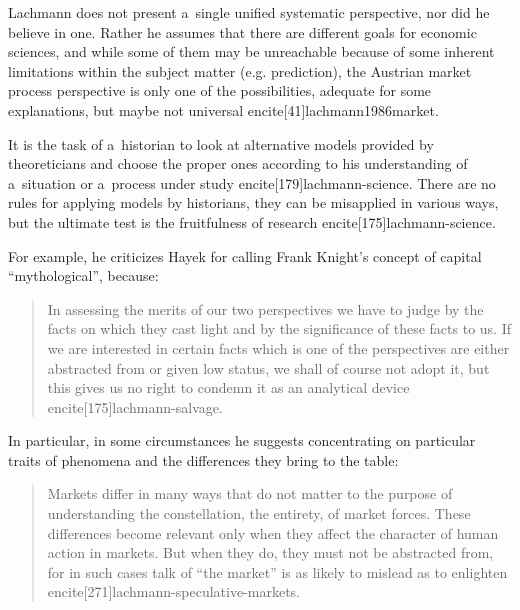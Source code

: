 {Lachmann does not present a~single unified systematic perspective, nor did he believe in one. Rather he assumes that there are different goals for economic sciences, and while some of them may be unreachable because of some inherent limitations within the subject matter (e.g. prediction), the Austrian market process perspective is only one of the possibilities, adequate for some explanations, but maybe not universal encite[41]{lachmann1986market}.



It is the task of a~historian to look at alternative models provided by theoreticians and choose the proper ones according to his understanding of a~situation or a~process under study encite[179]{lachmann-science}. There are no rules for applying models by historians, they can be misapplied in various ways, but the ultimate test is the fruitfulness of research encite[175]{lachmann-science}.

For example, he criticizes Hayek for calling Frank Knight's concept of capital ``mythological'', because:

\begin{quote}

In assessing the merits of our two perspectives we have to judge by the facts on which they cast light and by the significance of these facts to us. If we are interested in certain facts which is one of the perspectives are either abstracted from or given low status, we shall of course not adopt it, but this gives us no right to condemn it as an analytical device encite[175]{lachmann-salvage}.

\end{quote}

In particular, in some circumstances he suggests concentrating on particular traits of phenomena and the differences they bring to the table:

\begin{quote}

Markets differ in many ways that do not matter to the purpose of understanding the constellation, the entirety, of market forces. These differences become relevant only when they affect the character of human action in markets. But when they do, they must not be abstracted from, for in such cases talk of ``the market'' is as likely to mislead as to enlighten encite[271]{lachmann-speculative-markets}.

\end{quote}



}
